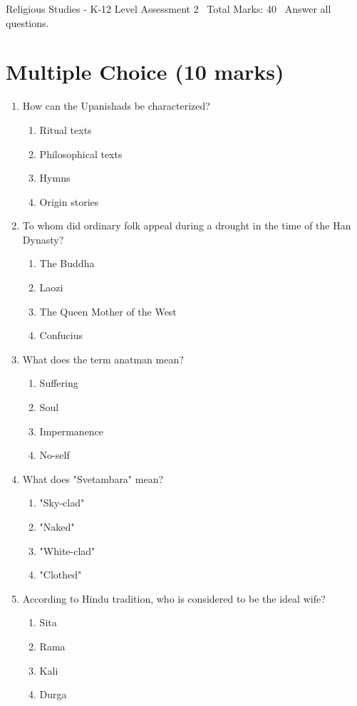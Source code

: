 \documentclass[12pt]{article}
\begin{document}
\begin{center}
Religious Studies - K-12 Level Assessment 2 \
Total Marks: 40 \
Answer all questions.
\end{center}

\section*{Multiple Choice (10 marks)}
\begin{enumerate}[label=\arabic*.]
\item How can the Upanishads be characterized?
\begin{enumerate}[label=(\alph*)]
    \item Ritual texts
    \item Philosophical texts
    \item Hymns
    \item Origin stories
\end{enumerate}
\item To whom did ordinary folk appeal during a drought in the time of the Han Dynasty?
\begin{enumerate}[label=(\alph*)]
    \item The Buddha
    \item Laozi
    \item The Queen Mother of the West
    \item Confucius
\end{enumerate}
\item What does the term anatman mean?
\begin{enumerate}[label=(\alph*)]
    \item Suffering
    \item Soul
    \item Impermanence
    \item No-self
\end{enumerate}
\item What does "Svetambara" mean?
\begin{enumerate}[label=(\alph*)]
    \item "Sky-clad"
    \item "Naked"
    \item "White-clad"
    \item "Clothed"
\end{enumerate}
\item According to Hindu tradition, who is considered to be the ideal wife?
\begin{enumerate}[label=(\alph*)]
    \item Sita
    \item Rama
    \item Kali
    \item Durga
\end{enumerate}
\end{enumerate}
\end{document}
